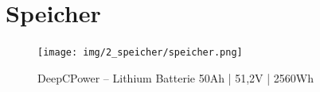 \section{Speicher}

\begin{figure}[!ht]
	\begin{center}
		\texttt{[image: img/2\_speicher/speicher.png]}
		\caption{DeepCPower – Lithium Batterie 50Ah | 51,2V | 2560Wh}
		\label{img_2_2:speicher_1:1}
	\end{center}
\end{figure}


